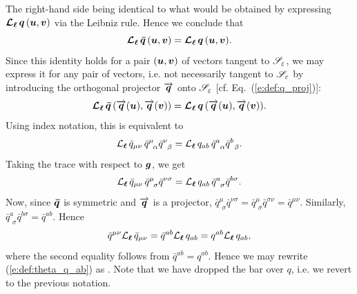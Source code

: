 The right-hand side being identical to what would be obtained by expressing
$\bm{\mathcal{L}}_{\bm{\ell}}\, \bm{q} \, (\bm{u},\bm{v})$ via the Leibniz rule. Hence we conclude
that
\[
    \bm{\mathcal{L}}_{\bm{\ell}}\, \bm{\bar q} \, (\bm{u},\bm{v}) = \bm{\mathcal{L}}_{\bm{\ell}}\, \bm{q} \, (\bm{u},\bm{v}) .
\]
Since this identity holds for a pair $(\bm{u},\bm{v})$ of vectors tangent
to $\mathscr{S}_\varepsilon$, we may express it for any pair of vectors, i.e. not
necessarily tangent to $\mathscr{S}_\varepsilon$ by introducing the orthogonal
projector $\overrightarrow{\bm{q}}$ onto $\mathscr{S}_\varepsilon$ [cf. Eq.~(\ref{e:def:q_proj})]:
\[
    \bm{\mathcal{L}}_{\bm{\ell}}\, \bm{\bar q} \, (\overrightarrow{\bm{q}}(\bm{u}),\overrightarrow{\bm{q}}(\bm{v})) =
    \bm{\mathcal{L}}_{\bm{\ell}}\, \bm{q} \, (\overrightarrow{\bm{q}}(\bm{u}),\overrightarrow{\bm{q}}(\bm{v})) .
\]
Using index notation, this is equivalent to
\[
    \Liec{\el} {\bar q}_{\mu\nu} \, {\bar q}^\mu_{\ \, \alpha} {\bar q}^\nu_{\ \, \beta} =
        \Liec{\el} {q}_{ab} \, {\bar q}^a_{\ \, \alpha} {\bar q}^b_{\ \, \beta} .
\]
Taking the trace with respect to $\bm{g}$, we get
\[
    \Liec{\el} {\bar q}_{\mu\nu} \, {\bar q}^\mu_{\ \, \sigma} {\bar q}^{\nu\sigma} =
        \Liec{\el} {q}_{ab} \, {\bar q}^a_{\ \, \sigma} {\bar q}^{b\sigma} .
\]
Now, since $\bm{\bar q}$ is symmetric and $\overrightarrow{\bm{q}}$ is a projector,
${\bar q}^\mu_{\ \, \sigma} {\bar q}^{\nu\sigma} = {\bar q}^\mu_{\ \, \sigma} {\bar q}^{\sigma\nu}
 = {\bar q}^{\mu\nu}$. Similarly, ${\bar q}^a_{\ \, \sigma} {\bar q}^{b\sigma} = {\bar q}^{ab}$.
Hence
\[
    {\bar q}^{\mu\nu} {\mathcal{L}}_{\bm{\ell}}\, {\bar q}_{\mu\nu} = {\bar q}^{ab}  {\mathcal{L}}_{\bm{\ell}}\, {q}_{ab}
    = q^{ab}  {\mathcal{L}}_{\bm{\ell}}\, {q}_{ab} ,
\]
where the second equality follows from
${\bar q}^{ab}  = q^{ab}$.
Hence we may rewrite (\ref{e:def:theta_q_ab}) as
\be \label{e:def:theta_q_munu}
   .
\ee
Note that we have dropped the bar over $q$, i.e. we revert to the previous notation.

